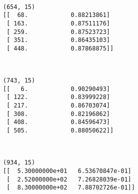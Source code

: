 \documentclass{article}
\begin{document}
    \begin{center}
    \end{center}
    { \hspace*{\fill} \\}
    
    \begin{Verbatim}[commandchars=\\\{\}]
(654, 15)
[[  68.            0.88213861]
 [ 163.            0.87511176]
 [ 259.            0.87523723]
 [ 351.            0.86435103]
 [ 448.            0.87868875]]
    \end{Verbatim}

    \begin{center}
    \end{center}
    { \hspace*{\fill} \\}
    
    \begin{Verbatim}[commandchars=\\\{\}]
(743, 15)
[[   6.            0.90290493]
 [ 122.            0.83999228]
 [ 217.            0.86703074]
 [ 308.            0.82196862]
 [ 408.            0.84596473]
 [ 505.            0.88050622]]
    \end{Verbatim}

    \begin{center}
    \end{center}
    { \hspace*{\fill} \\}
    
    \begin{Verbatim}[commandchars=\\\{\}]
(934, 15)
[[  5.30000000e+01   6.53670847e-01]
 [  2.52000000e+02   7.26828039e-01]
 [  8.30000000e+02   7.88702726e-01]]
    \end{Verbatim}

    \begin{center}
    \end{center}
    { \hspace*{\fill} \\}
    
\end{document}
